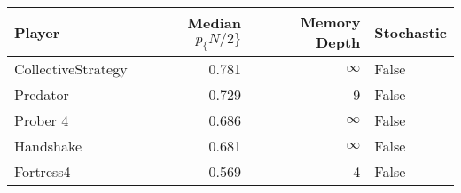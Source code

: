 \begin{tabular}{lrrl}
\toprule
             Player &  Median $p_\{N/2\}$ &  Memory Depth & Stochastic \\
\midrule
 CollectiveStrategy &             0.781 &            \(\infty\) &      False \\
           Predator &             0.729 &             9 &      False \\
           Prober 4 &             0.686 &            \(\infty\) &      False \\
          Handshake &             0.681 &            \(\infty\) &      False \\
          Fortress4 &             0.569 &             4 &      False \\
\bottomrule
\end{tabular}

